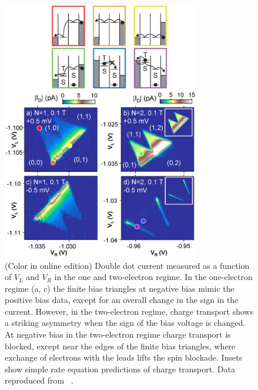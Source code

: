 \documentclass[12pt,aps,nofootinbib]{revtex4-1}
\begin{document}
\begin{figure}[htb]
\begin{center}
\includegraphics[width=8.6cm]{hanson_fig34.eps}
\end{center}
\caption{(Color in online edition) Double dot current measured as a
function of $V_L$ and $V_R$ in the one and two-electron regime. In
the one-electron regime (a, c) the finite bias triangles at
negative bias mimic the positive bias data, except for an overall
change in the sign in the current. However, in the two-electron
regime, charge transport shows a striking asymmetry when the sign
of the bias voltage is changed. At negative bias in the
two-electron regime charge transport is blocked, except near the
edges of the finite bias triangles, where exchange of electrons
with the leads lifts the spin blockade. Insets show simple rate
equation predictions of charge transport. Data
reproduced from ~\textcite{JohnsonSpinBlock}.}%
\label{Fig:Johnson:Transport}
\end{figure}
\end{document}

